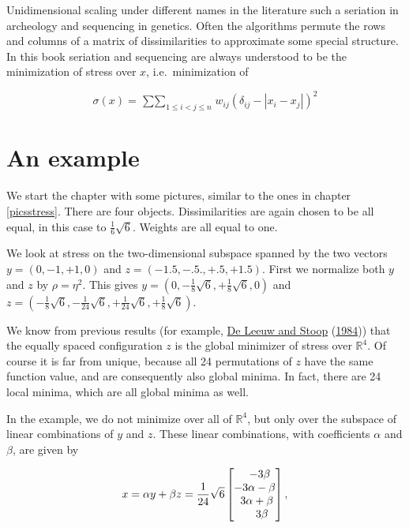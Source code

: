 \documentclass[
  12pt,
]{book}
\theoremstyle{definition}
\theoremstyle{definition}
\theoremstyle{definition}
\theoremstyle{definition}
\theoremstyle{remark}
\begin{document}
Unidimensional scaling under different names in the literature such a seriation in archeology and sequencing in genetics. Often the algorithms permute the rows and columns of a matrix of dissimilarities to approximate some special structure. In this book seriation and sequencing are always understood to be
the minimization of stress over \(x\), i.e.~minimization of

\begin{equation}
\sigma(x)=\mathop{\sum\sum}_{1\leq i<j\leq n}w_{ij}(\delta_{ij}-|x_i-x_j|)^2
\label{eq:unistress}
\end{equation}

\hypertarget{an-example}{%
\section{An example}\label{an-example}}

We start the chapter with some pictures, similar to the ones in chapter \ref{picsstress}. There are four objects. Dissimilarities are again chosen to be all equal, in this case to \(\frac16\sqrt{6}\). Weights are all equal to one.

We look at stress on the two-dimensional subspace spanned by the two vectors \(y=(0,-1,+1,0)\) and \(z=(-1.5,-.5.,+.5,+1.5)\). First we normalize both \(y\) and \(z\) by \(\rho=\eta^2\). This gives \(y=(0,-\frac18\sqrt{6},+\frac18\sqrt{6},0)\) and \(z=(-\frac18\sqrt{6},-\frac{1}{24}\sqrt{6},+\frac{1}{24}\sqrt{6},+\frac18\sqrt{6})\).

We know from previous results (for example, \protect\hyperlink{ref-deleeuw_stoop_A_84}{De Leeuw and Stoop} (\protect\hyperlink{ref-deleeuw_stoop_A_84}{1984})) that the equally spaced configuration \(z\) is the global minimizer of stress over \(\mathbb{R}^4\). Of course it is far from unique, because all 24 permutations of \(z\) have the same function value, and are consequently also global minima. In fact, there are 24 local minima, which are all global minima as well.

In the example, we do not minimize over all of \(\mathbb{R}^4\), but only over the subspace of linear combinations of \(y\) and \(z\). These linear combinations, with coefficients \(\alpha\) and \(\beta\), are given by

\begin{equation}
x=\alpha y+\beta z=\frac{1}{24}\sqrt{6}\begin{bmatrix}\hfill-3\beta\\\hfill-3\alpha-\beta\\
\hfill3\alpha+\beta\\\hfill3\beta\end{bmatrix},
\label{eq:umdslincom}
\end{equation}
\end{document}
